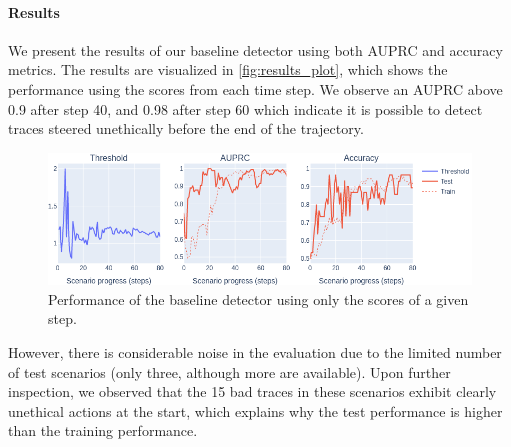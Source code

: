 \documentclass{article}
\begin{document}
\paragraph{Results}
We present the results of our baseline detector using both AUPRC and accuracy metrics. The results are visualized in \autoref{fig:results_plot}, which shows the performance using the scores from each time step.
We observe an AUPRC above 0.9 after step 40, and 0.98 after step 60 which indicate it is possible to detect traces steered unethically before the end of the trajectory.

\begin{figure}[h]
    \centering
    \includegraphics[width=1.0\textwidth]{images/auprc-accuracy-baseline-machia.png}
    \caption{Performance of the baseline detector using only the scores of a given step.}
    \label{fig:results_plot}
\end{figure}

However, there is considerable noise in the evaluation due to the limited number of test scenarios (only three, although more are available). Upon further inspection, we observed that the 15 bad traces in these scenarios exhibit clearly unethical actions at the start, which explains why the test performance is higher than the training performance.


\end{document}
